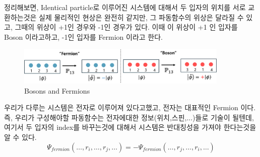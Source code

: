 \documentclass[10pt]{article}
\begin{document}
정리해보면, Identical particle로 이루어진 시스템에 대해서 두 입자의 위치를 서로 교환하는것은 실제 물리적인 현상은 완전히 같지만, 그 파동함수의 위상은 달라질 수 있고, 
그때의 위상이 +1인 경우와 -1인 경우가 있다. 
이때 이 위상이 +1 인 입자를 Boson 이라고하고, -1인 입자를 Fermion 이라고 한다. 

\begin{figure}[htbp]
  \centering
  \includegraphics[width=0.9\textwidth]{fig/idet3.png}
  \caption{Bosons and Fermions}
  \label{fig:example2}
\end{figure}

우리가 다루는 시스템은 전자로 이루어져 있다고했고, 전자는 대표적인 Fermion 이다. 
즉, 우리가 구성해야할 파동함수는 전자에대한 정보(위치,스핀,...)들로 기술이 될텐데, 여기서 두 입자의 index를 바꾸는것에 대해서 시스템은 반대칭성을 가져야 한다는것을 알 수 있다. 
\[
\Psi_{fermion}(\dots, r_i, \dots, r_j, \dots) = -\Psi_{fermion}(\dots, r_j, \dots, r_i, \dots)
\]
\end{document}
